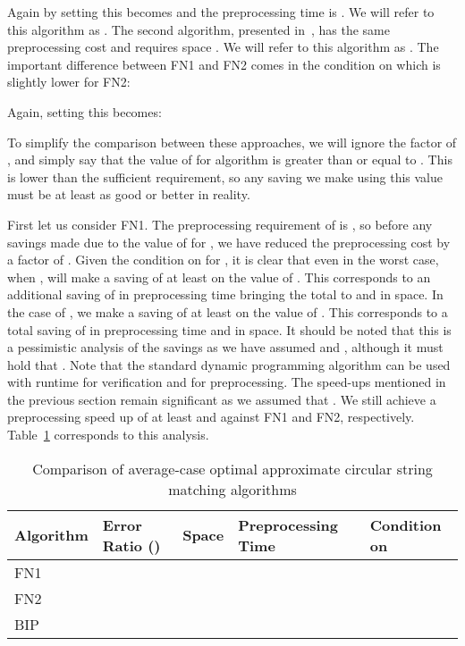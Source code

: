 \documentclass[runningheads, envcountsame, a4paper]{llncs}\usepackage{etex}
\begin{document}
\noindent Again by setting  this becomes
 and the preprocessing time is . We will refer to this algorithm as . The second algorithm, presented in~\cite{Fredriksson:2004:ASM:1005813.1041513}, has the same preprocessing cost and requires space . We will refer to this algorithm as . The important difference between \textsf{FN1} and \textsf{FN2} comes in the condition on  which is slightly lower for \textsf{FN2}:



\noindent Again, setting  this becomes:



To simplify the comparison between these approaches, we will ignore the factor of , and simply say that the value of  for algorithm  is greater than or equal to . This is lower than the sufficient requirement, so any saving we make using this value must be at least as good or better in reality.

First let us consider \textsf{FN1}. The preprocessing requirement of  is , so before any savings made due to the value of  for , we have reduced the preprocessing cost by a factor of . Given the condition on  for , it is clear that even in the worst case, when ,  will make a saving of at least  on the value of . This corresponds to an additional saving of  in preprocessing time bringing the total to  and  in space. 
In the case of , we make a saving of at least  on the value of . This corresponds to a total saving of  in preprocessing time and  in space. It should be noted that this is a pessimistic analysis of the savings as we have assumed  and , although it must hold that . Note that the standard dynamic programming algorithm can be used with runtime  for verification and  for preprocessing. The speed-ups mentioned in the previous section remain significant as we assumed
that . We still achieve a preprocessing speed up of at least  and  against \textsf{FN1} and \textsf{FN2}, respectively.
Table~\ref{tab:comparison} corresponds to this analysis. 

\begin{table}[h]
\begin{center}
\caption{Comparison of average-case optimal approximate circular string matching algorithms}
\label{tab:comparison}
\begin{tabular}{|l|l|l|l|l|}
\hline Algorithm & Error Ratio () & Space & Preprocessing Time & Condition on  \\ \hline
\textsf{FN1} &  &  &  & \\ \hline
\textsf{FN2} &  &  &  &  \\ \hline 
\textsf{BIP} &  &  &  & \\ \hline
\end{tabular}
\end{center}
\end{table}
\end{document}
